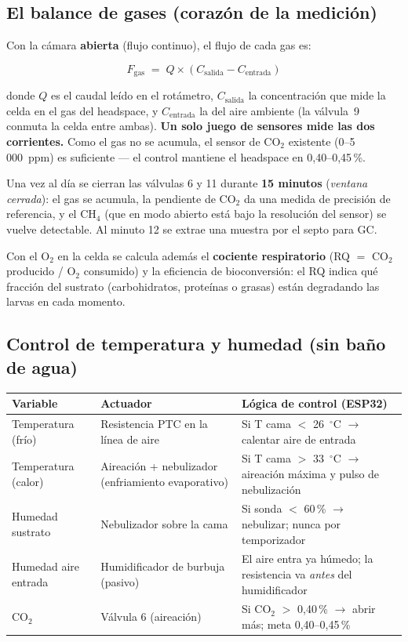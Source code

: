 \documentclass[11pt,a4paper]{article}
\begin{document}
\subsection{El balance de gases (corazón de la medición)}
Con la cámara \textbf{abierta} (flujo continuo), el flujo de cada gas es:

\[
F_{\text{gas}} \;=\; Q \times \left(C_{\text{salida}} - C_{\text{entrada}}\right)
\]

donde $Q$ es el caudal leído en el rotámetro, $C_{\text{salida}}$ la
concentración que mide la celda en el gas del headspace, y
$C_{\text{entrada}}$ la del aire ambiente (la válvula~9 conmuta la celda
entre ambas). \textbf{Un solo juego de sensores mide las dos corrientes.}
Como el gas no se acumula, el sensor de CO$_2$ existente (0--5\,000~ppm) es
suficiente --- el control mantiene el headspace en 0,40--0,45\,\%.

Una vez al día se cierran las válvulas 6 y 11 durante \textbf{15 minutos}
(\emph{ventana cerrada}): el gas se acumula, la pendiente de CO$_2$ da una
medida de precisión de referencia, y el CH$_4$ (que en modo abierto está bajo
la resolución del sensor) se vuelve detectable. Al minuto 12 se extrae una
muestra por el septo para GC.

Con el O$_2$ en la celda se calcula además el \textbf{cociente
respiratorio} (RQ $=$ CO$_2$ producido / O$_2$ consumido) y la eficiencia de
bioconversión: el RQ indica qué fracción del sustrato (carbohidratos,
proteínas o grasas) están degradando las larvas en cada momento.

\subsection{Control de temperatura y humedad (sin baño de agua)}
\begin{center}
\begin{tabular}{@{}p{2.8cm}p{4.8cm}p{5.6cm}@{}}
\toprule
\textbf{Variable} & \textbf{Actuador} & \textbf{Lógica de control (ESP32)} \\
\midrule
Temperatura (frío) & Resistencia PTC en la línea de aire &
Si T cama $<$ 26~$^\circ$C $\rightarrow$ calentar aire de entrada \\
Temperatura (calor) & Aireación + nebulizador (enfriamiento
evaporativo) & Si T cama $>$ 33~$^\circ$C $\rightarrow$ aireación máxima y
pulso de nebulización \\
Humedad sustrato & Nebulizador sobre la cama &
Si sonda $<$ 60\,\% $\rightarrow$ nebulizar; nunca por temporizador \\
Humedad aire entrada & Humidificador de burbuja (pasivo) &
El aire entra ya húmedo; la resistencia va \emph{antes} del humidificador \\
CO$_2$ & Válvula 6 (aireación) &
Si CO$_2$ $>$ 0,40\,\% $\rightarrow$ abrir más; meta 0,40--0,45\,\% \\
\bottomrule
\end{tabular}
\end{center}
\end{document}
